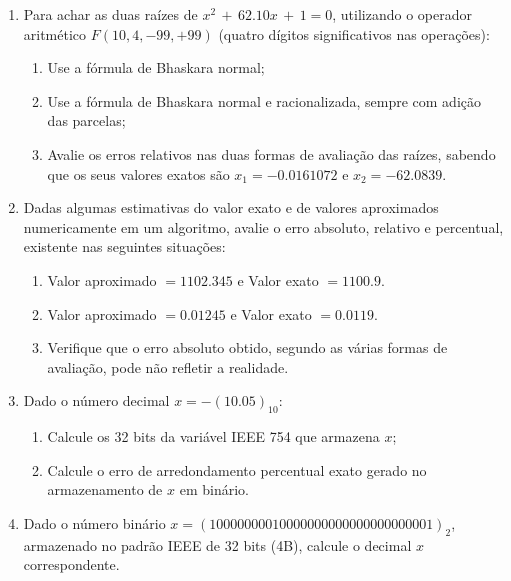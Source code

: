 \documentclass[12pt]{article}
\newenvironment{smallitem}{
    \vspace{-2mm}
    \begin{enumerate}
    \setlength{\parskip}{0pt}
    \setlength{\itemsep}{2pt}
}{
    \vspace{-2mm}
    \end{enumerate}
}
\begin{document}
\begin{enumerate}[label=\textbf{\arabic*})]
\item Para achar as duas raízes de $x^2 \, + \, 62.10x \, + \, 1 = 0$,
utilizando o operador aritmético $F(10, 4, -99, +99)$ (quatro dígitos
significativos nas operações):

\begin{smallitem}

\item Use a fórmula de Bhaskara normal;

\item Use a fórmula de Bhaskara normal e racionalizada, sempre com adição das
parcelas;

\item Avalie os erros relativos nas duas formas de avaliação das raízes, sabendo
que os seus valores exatos são $x_1 = -0.0161072$ e $x_2 = - 62.0839$.

\end{smallitem}

\item Dadas algumas estimativas do valor exato e de valores aproximados
numericamente em um algoritmo, avalie o erro absoluto, relativo e percentual,
existente nas seguintes situações:

\begin {smallitem}

\item Valor aproximado $= 1102.345$ e Valor exato $= 1100.9$.

\item Valor aproximado $= 0.01245$ e Valor exato $= 0.0119$.

\item Verifique que o erro absoluto obtido, segundo as várias formas de
avaliação, pode não refletir a realidade.

\end{smallitem}

\item Dado o número decimal $x = -(10.05)_{10}$:

\begin{smallitem}

\item Calcule os 32 bits da variável IEEE 754 que armazena $x$;

\item Calcule o erro de arredondamento percentual exato gerado no armazenamento
de $x$ em binário.

\end{smallitem}

\item Dado o número binário $x = (10000000010000000000000000000001)_2$,
armazenado no padrão IEEE de 32 bits (4B), calcule o decimal $x$ correspondente.


\end{enumerate}
\end{document}
